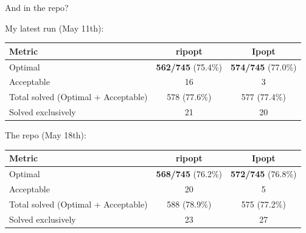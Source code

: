 \documentclass{beamer}
\begin{document}
\begin{frame}{And in the repo?}

  \footnotesize
  My latest run (May 11th):
  \vfill

  \centering
  \begin{tabular}{@{}lcc@{}}
    \toprule
    Metric                              & ripopt                    & Ipopt                     \\
    \midrule
    Optimal                             & \textbf{562/745} (75.4\%) & \textbf{574/745} (77.0\%) \\
    Acceptable                          & 16                        & 3                         \\
    Total solved (Optimal + Acceptable) & 578 (77.6\%)              & 577 (77.4\%)              \\
    Solved exclusively                  & 21                        & 20                        \\
    \bottomrule
  \end{tabular}

  \vfill
  \raggedright
  The repo (May 18th):
  \vfill

  \centering
  \footnotesize
  \begin{tabular}{@{}lcc@{}}
    \toprule
    Metric                              & ripopt                    & Ipopt                     \\
    \midrule
    Optimal                             & \textbf{568/745} (76.2\%) & \textbf{572/745} (76.8\%) \\
    Acceptable                          & 20                        & 5                         \\
    Total solved (Optimal + Acceptable) & 588 (78.9\%)              & 575 (77.2\%)              \\
    Solved exclusively                  & 23                        & 27                        \\
    \bottomrule
  \end{tabular}

\end{frame}
\end{document}
